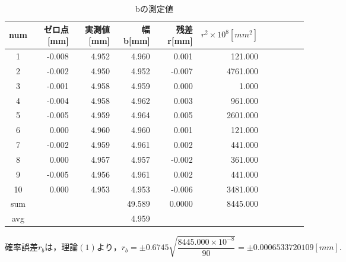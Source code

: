 \documentclass[a4paper,1pt]{jsarticle}
\begin{document}
\begin{table}[H]
  \caption{bの測定値}
  \label{table:SpeedOfLight}
  \centering
  \begin{tabular}{|c||r|r|r|r|r|r|r|r|r|r|}
    \hline
    num & ゼロ点[mm] & 実測値[mm] & 幅 b[mm] & 残差 r[mm] & $r^2\times10^8[mm^2]$  \\
    \hline\hline
    1 & -0.008 & 4.952 & 4.960  & 0.001  & 121.000 \\
    2 & -0.002 & 4.950 & 4.952  & -0.007  & 4761.000 \\
    3 & -0.001 & 4.958 & 4.959  & 0.000  & 1.000 \\
    4 & -0.004 & 4.958 & 4.962  & 0.003  & 961.000 \\
    5 & -0.005 & 4.959 & 4.964  & 0.005  & 2601.000 \\
    6 & 0.000 & 4.960 & 4.960  & 0.001  & 121.000 \\
    7 & -0.002 & 4.959 & 4.961  & 0.002  & 441.000 \\
    8 & 0.000 & 4.957 & 4.957  & -0.002  & 361.000 \\
    9 & -0.005 & 4.956 & 4.961  & 0.002  & 441.000 \\
    10 & 0.000 & 4.953 & 4.953  & -0.006  & 3481.000 \\
    
    \hline\hline
    sum &  &  & 49.589  & 0.0000 & 8445.000 \\
    \hline
    avg &  &  & 4.959 &  &  \\

    \hline
  \end{tabular}

\end{table}

$確率誤差r_bは，理論(1)より，r_b=\pm0.6745\sqrt{\dfrac{8445.000\times10^{-8}}{90}}=\pm0.0006533720109[mm].$
\end{document}
